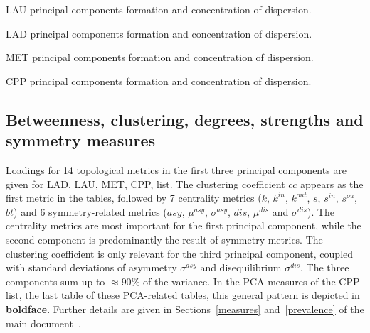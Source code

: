 \documentclass[%
 aip,
 jmp,%
 amsmath,amssymb,
 reprint,%
 floatfix,
]{revtex4-1}
\begin{document}
\begin{table}[!h]
	\caption{LAU principal components formation and concentration of dispersion.}
	\footnotesize
	
\label{tab:pcain}
\end{table}
\begin{table}[!h]
	\caption{LAD principal components formation and concentration of dispersion.}
	\footnotesize
	
\label{tab:pcain}
\end{table}
\begin{table}[!h]
	\caption{MET principal components formation and concentration of dispersion.}
	\footnotesize
	
\label{tab:pcain}
\end{table}
\begin{table}[!h]
	\caption{CPP principal components formation and concentration of dispersion.}
	\footnotesize
	
\label{tab:pcain}
\end{table}


\FloatBarrier
\subsection{Betweenness, clustering, degrees, strengths and symmetry measures}

Loadings for 14 topological metrics in the first three principal components are given for LAD, LAU, MET, CPP, list.
The clustering coefficient $cc$ appears as the first metric in the tables, followed by 7 centrality metrics ($k$, $k^{in}$, $k^{out}$, $s$, $s^{in}$, $s^{ou}$, $bt$) and 6 symmetry-related metrics ($asy$, $\mu^{asy}$, $\sigma^{asy}$, $dis$, $\mu^{dis}$ and $\sigma^{dis}$).
The centrality metrics are most important for the first principal component, while the second component is predominantly the result of symmetry metrics.
The clustering coefficient is only relevant for the third principal component, coupled with standard deviations of asymmetry $\sigma^{asy}$ and disequilibrium $\sigma^{dis}$.
The three components sum up to $\approx90\%$ of the variance.
In the PCA measures of the CPP list, the last table of these PCA-related tables, this general pattern is depicted in {\bf boldface}.
Further details are given in Sections~\ref*{measures} and~\ref*{prevalence} of the main document~\cite{tpaper}.
\end{document}
